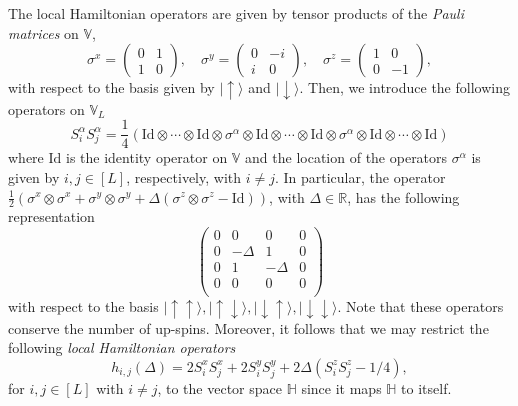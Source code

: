 \documentclass[a4paper,11pt]{article}
\theoremstyle{definition}
\begin{document}
The local Hamiltonian operators are given by tensor products of the \emph{Pauli matrices} on $\mathbb{V}$,
\begin{equation}
    \sigma^x = \left(\begin{array}{cc}
         0& 1 \\
         1& 0
    \end{array}\right),\quad
    \sigma^y = \left(\begin{array}{cc}
         0& -i \\
         i& 0
    \end{array}\right),\quad
    \sigma^z = \left(\begin{array}{cc}
         1& 0 \\
         0& -1
    \end{array}\right),
\end{equation}
with respect to the basis given by $\mid \uparrow \rangle$ and $\mid \downarrow \rangle$. Then, we introduce the following operators on $\mathbb{V}_L$
\begin{equation}
    S^{\alpha}_iS^{\alpha}_j = \frac{1}{4}\left(\mathrm{Id} \otimes\cdots \otimes \mathrm{Id} \otimes \sigma^{\alpha} \otimes \mathrm{Id} \otimes\cdots \otimes \mathrm{Id} \otimes \sigma^{\alpha} \otimes \mathrm{Id} \otimes\cdots \otimes \mathrm{Id}\right)
\end{equation}
where $\mathrm{Id}$ is the identity operator on $\mathbb{V}$ and the location of the operators $\sigma^{\alpha}$ is given by $i,j \in [L]$, respectively, with $i \neq j$. In particular, the operator $\frac12\left(\sigma^x \otimes \sigma^x+ \sigma^y \otimes \sigma^y +\Delta( \sigma^z\otimes \sigma^z - \mathrm{Id})\right)$, with $\Delta \in \mathbb{R}$, has the following representation
\begin{equation} \label{e: local hamiltonian matrix}
    \left( \begin{array}{cccc}
         0 & 0 & 0 &0  \\
         0 & -\Delta & 1 &0  \\
         0 & 1 & -\Delta &0  \\
         0 & 0 & 0 &0  \\
    \end{array}\right)
\end{equation}
with respect to the basis $\mid \uparrow \uparrow \rangle, \mid \uparrow \downarrow \rangle, \mid \downarrow \uparrow \rangle, \mid \downarrow \downarrow \rangle$. Note that these operators conserve the number of up-spins. Moreover, it follows that we may restrict the following \emph{local Hamiltonian operators}
\begin{equation}\label{e:local_operator}
    h_{i,j}(\Delta) = 2S^x_{i}S^x_{j}+ 2S^y_{i}S^y_{j} +2\Delta (S^z_{i}S^z_{j}-1/4),
\end{equation}
for $i, j \in [L]$ with $i \neq j$, to the vector space $\mathbb{H}$ since it maps $\mathbb{H}$ to itself.
\end{document}
